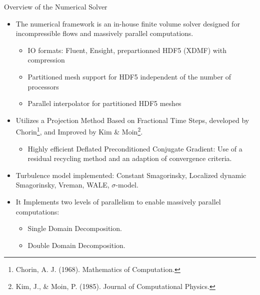 \documentclass[10pt]{beamer}
\begin{document}
\begin{frame}{Overview of the Numerical Solver}
\begin{itemize}
\item[\large\ding{113}] The numerical framework is an in-house finite volume solver designed for incompressible flows and massively parallel computations.
\begin{itemize}
\item[\large\ding{52}] IO formats: Fluent, Ensight, prepartionned HDF5 (XDMF) with compression
\item[\large\ding{52}] Partitioned mesh support for HDF5 independent of the number of processors
\item[\large\ding{52}] Parallel interpolator for partitioned HDF5 meshes
\end{itemize}
\item[\large\ding{113}] Utilizes a Projection Method Based on Fractional Time Steps, developed by Chorin\footnote[frame]{\tiny\color{um6pcolor} Chorin, A. J. (1968). Mathematics of Computation.}, and Improved by Kim \& Moin\footnote[frame]{\tiny\color{um6pcolor} Kim, J., \& Moin, P. (1985). Journal of Computational Physics.}.
\begin{itemize}
\item[\large\ding{52}] Highly efficient Deflated Preconditioned Conjugate Gradient: Use of a residual recycling method and an adaption of convergence criteria.
\end{itemize}
\item[\large\ding{113}] Turbulence model implemented: Constant Smagorinsky, Localized dynamic Smagorinsky, Vreman, WALE, $\sigma$-model.
\item[\large\ding{113}] It Implements two levels of parallelism to enable massively parallel computations:
\begin{itemize}
\item[\large\ding{52}] Single Domain Decomposition.
\item[\large\ding{52}] Double Domain Decomposition.
\end{itemize}
\end{itemize}
\end{frame}

\end{document}
